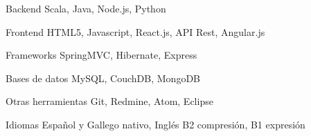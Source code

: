 


\begin{cvskills}


\cvskill
{Backend} %
{Scala, Java, Node.js, Python} %


\cvskill
{Frontend} %
{HTML5, Javascript, React.js, API Rest, Angular.js} %


\cvskill
{Frameworks} %
{SpringMVC, Hibernate, Express} %


\cvskill
{Bases de datos} %
{MySQL, CouchDB, MongoDB} %


\cvskill
{Otras herramientas} %
{Git, Redmine, Atom, Eclipse} %


\cvskill
{Idiomas} %
{Español y Gallego nativo, Inglés B2 compresión, B1 expresión} %


\end{cvskills}